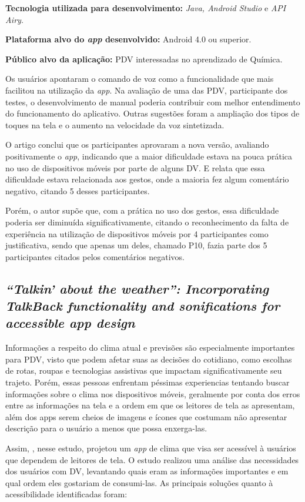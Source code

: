 \textbf{Tecnologia utilizada para desenvolvimento:} \emph{Java, Android Studio} e \emph{API Airy}.

\textbf{Plataforma alvo do \emph{app} desenvolvido:} Android 4.0 ou superior.

\textbf{Público alvo da aplicação:} PDV interessadas no aprendizado de Química\@.

Os usuários apontaram o comando de voz como a funcionalidade que mais facilitou na utilização da \emph{app}.
Na avaliação de uma das PDV, participante dos testes, o desenvolvimento de manual poderia contribuir com melhor entendimento do funcionamento do aplicativo.
Outras sugestões foram a ampliação dos tipos de toques na tela e o aumento na velocidade da voz sintetizada.

O artigo conclui que os participantes aprovaram a nova versão, avaliando positivamente o \emph{app}, indicando que a maior dificuldade estava na pouca prática no uso de dispositivos móveis por parte de alguns DV\@.
E relata que essa dificuldade estava relacionada aos gestos, onde a maioria fez algum comentário negativo, citando 5 desses participantes.

Porém, o autor supõe que, com a prática no uso dos gestos, essa dificuldade poderia ser diminuída significativamente, citando o reconhecimento da falta de experiência na utilização de dispositivos móveis por 4 participantes como justificativa, sendo que apenas um deles, chamado P10, fazia parte dos 5 participantes citados pelos comentários negativos.

\subsection{\emph{``Talkin' about the weather'': Incorporating TalkBack functionality and sonifications for accessible app design}}

Informações a respeito do clima atual e previsões são especialmente importantes para PDV, visto que podem afetar suas as decisões do cotidiano, como escolhas de rotas, roupas e tecnologias assistivas que impactam significativamente seu trajeto.
Porém, essas pessoas enfrentam péssimas experiencias tentando buscar informações sobre o clima nos dispositivos móveis, geralmente por conta dos erros entre as informações na tela e a ordem em que os leitores de tela as apresentam, além dos apps serem cheios de imagens e ícones que costumam não apresentar descrição para o usuário a menos que possa enxerga-las.

Assim, , nesse estudo, projetou um \emph{app} de clima que visa ser acessível à usuários que dependem de leitores de tela.
O estudo realizou uma análise das necessidades dos usuários com DV, levantando quais eram as informações importantes e em qual ordem eles gostariam de consumi-las.
As principais soluções quanto à acessibilidade identificadas foram:

